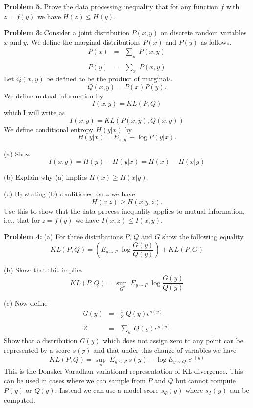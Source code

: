 \documentclass{article}
\begin{document}
\bigskip
{\bf Problem 5.}
Prove the data processing inequality that for any function $f$ with $z = f(y)$ we have $H(z) \leq H(y)$.

\bigskip
{\bf Problem 3:} Consider a joint distribution $P(x,y)$ on discrete random variables $x$ and $y$.
We define the marginal distributions $P(x)$ and $P(y)$ as follows.
\begin{eqnarray*}
  P(x) & = & \sum_y\;P(x,y) \\
  \\
  P(y) & = & \sum_x\;P(x,y)
\end{eqnarray*}
Let $Q(x,y)$ be defined to be the product of marginals.
$$Q(x,y) = P(x)P(y).$$
We define mutual information by
{\color{red} $$I(x,y) = KL(P,Q)$$}
which I will write as
{\color{red} $$I(x,y) = KL(P(x,y),Q(x,y))$$}
We define conditional entropy $H(y|x)$ by
{\color{red} $$H(y|x) = E_{x,y} \;-\log P(y|x).$$}

(a) Show
{\color{red} $$I(x,y) = H(y) - H(y|x) = H(x) - H(x|y)$$}

(b) Explain why (a) implies $H(x) \geq H(x|y)$.

\medskip
(c) By stating (b) conditioned on $z$ we have
$$H(x|z) \geq H(x|y,z).$$
Use this to show that the data process inequality applies to mutual information,
i.e., that for $z = f(y)$ we have $I(x,z) \leq I(x,y)$.

\bigskip
{\bf Problem 4:}
(a) For three distributions $P$, $Q$ and $G$ show the following equality.
$$KL(P,Q) =  \left(E_{y \sim P} \;\log \frac{G(y)}{Q(y)}\right) + KL(P,G)$$

(b) Show that this implies
$$KL(P,Q) =  \sup_G \;E_{y \sim P}\; \log \frac{G(y)}{Q(y)}$$

(c) Now define
\begin{eqnarray*}
  G(y) & = & \frac{1}{Z}\;Q(y)e^{s(y)} \\
  \\
  Z & = & \sum_y \;Q(y)e^{s(y)}
\end{eqnarray*}
Show that a distribution $G(y)$ which does not assign zero to any point can be represented by a score $s(y)$ and that under this
change of variables we have
$$KL(P,Q) =  \sup_s \;E_{y \sim P}\; s(y) - \log E_{y \sim Q} \;e^{s(y)}$$
This is the Donsker-Varadhan variational representation of KL-divergence.
This can be used in cases where we can sample from $P$ and $Q$ but cannot compute $P(y)$ or $Q(y)$.
Instead we can use a model score $s_\Phi(y)$ where $s_\Phi(y)$ can be computed.
\end{document}
